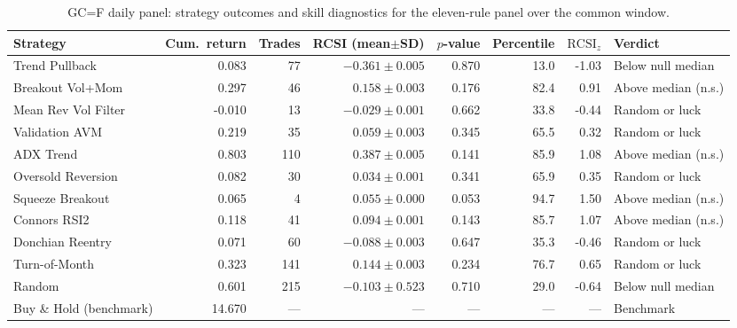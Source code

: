 \documentclass[preprint,12pt]{elsarticle}
\theoremstyle{definition}
\begin{document}
\begin{table}[t]
\centering
\caption{GC=F daily panel: strategy outcomes and skill diagnostics for the eleven-rule panel over the common window.}
\label{tab:main}
{\small
\renewcommand{\arraystretch}{1.15}
\setlength{\tabcolsep}{5pt}
\begin{adjustbox}{max width=\textwidth}
\begin{tabular}{@{}lrrrrrrl@{}}
\toprule
Strategy & Cum.\ return & Trades & RCSI (mean$\pm$SD) & $p$-value & Percentile & $\mathrm{RCSI}_z$ & Verdict \\
\midrule
Trend Pullback      & 0.083 &  77 & $-0.361\pm0.005$ & 0.870 & 13.0 & -1.03 & Below null median \\
Breakout Vol+Mom    & 0.297 &  46 & $\phantom{-}0.158\pm0.003$ & 0.176 & 82.4 & \phantom{-}0.91 & Above median (n.s.) \\
Mean Rev Vol Filter & -0.010 & 13 & $-0.029\pm0.001$ & 0.662 & 33.8 & -0.44 & Random or luck \\
Validation AVM      & 0.219 &  35 & $\phantom{-}0.059\pm0.003$ & 0.345 & 65.5 & \phantom{-}0.32 & Random or luck \\
ADX Trend           & 0.803 & 110 & $\phantom{-}0.387\pm0.005$ & 0.141 & 85.9 & \phantom{-}1.08 & Above median (n.s.) \\
Oversold Reversion  & 0.082 &  30 & $\phantom{-}0.034\pm0.001$ & 0.341 & 65.9 & \phantom{-}0.35 & Random or luck \\
Squeeze Breakout    & 0.065 &   4 & $\phantom{-}0.055\pm0.000$ & 0.053 & 94.7 & \phantom{-}1.50 & Above median (n.s.) \\
Connors RSI2        & 0.118 &  41 & $\phantom{-}0.094\pm0.001$ & 0.143 & 85.7 & \phantom{-}1.07 & Above median (n.s.) \\
Donchian Reentry    & 0.071 &  60 & $-0.088\pm0.003$ & 0.647 & 35.3 & -0.46 & Random or luck \\
Turn-of-Month       & 0.323 & 141 & $\phantom{-}0.144\pm0.003$ & 0.234 & 76.7 & \phantom{-}0.65 & Random or luck \\
Random              & 0.601 & 215 & $-0.103\pm0.523$ & 0.710 & 29.0 & -0.64 & Below null median \\
\midrule
Buy \& Hold (benchmark) & 14.670 & --- & --- & --- & --- & --- & Benchmark \\
\bottomrule
\end{tabular}
\end{adjustbox}
}
\par\vspace{0.75em}

\end{table}
\end{document}
